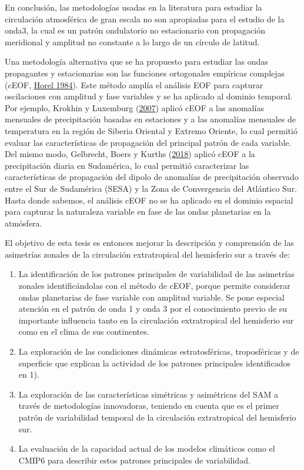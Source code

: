 \documentclass[12pt,oneside,a4paper]{reedthesis}
\begin{document}
En conclusión, las metodologías usadas en la literatura para estudiar la circulación atmosférica de gran escala no son apropiadas para el estudio de la onda3, la cual es un patrón ondulatorio no estacionario con propagación meridional y amplitud no constante a lo largo de un círculo de latitud.

Una metodología alternativa que se ha propuesto para estudiar las ondas propagantes y estacionarias son las funciones ortogonales empíricas complejas (cEOF, \protect\hyperlink{ref-horel1984}{Horel 1984}).
Este método amplía el análisis EOF para capturar oscilaciones con amplitud y fase variables y se ha aplicado al dominio temporal.
Por ejemplo, Krokhin y Luxemburg (\protect\hyperlink{ref-krokhin2007}{2007}) aplicó cEOF a las anomalías mensuales de precipitación basadas en estaciones y a las anomalías mensuales de temperatura en la región de Siberia Oriental y Extremo Oriente, lo cual permitió evaluar las características de propagación del principal patrón de cada variable.
Del mismo modo, Gelbrecht, Boers y Kurths (\protect\hyperlink{ref-gelbrecht2018}{2018}) aplicó cEOF a la precipitación diaria en Sudamérica, lo cual permitió caracterizar las características de propagación del dipolo de anomalías de precipitación observado entre el Sur de Sudamérica (SESA) y la Zona de Convergencia del Atlántico Sur.
Hasta donde sabemos, el análisis cEOF no se ha aplicado en el dominio espacial para capturar la naturaleza variable en fase de las ondas planetarias en la atmósfera.

El objetivo de esta tesis es entonces mejorar la descripción y comprensión de las asimetrías zonales de la circulación extratropical del hemisferio sur a través de:

\begin{enumerate}
\def\labelenumi{\arabic{enumi}.}
\item
  La identificación de los patrones principales de variabilidad de las asimetrías zonales identificándolas con el método de cEOF, porque permite considerar ondas planetarias de fase variable con amplitud variable.
  Se pone especial atención en el patrón de onda 1 y onda 3 por el conocimiento previo de su importante influencia tanto en la circulación extratropical del hemisferio sur como en el clima de sus continentes.
\item
  La exploración de las condiciones dinámicas estratosféricas, troposféricas y de superficie que explican la actividad de los patrones principales identificados en 1).
\item
  La exploración de las características simétricas y asimétricas del SAM a través de metodologías innovadoras, teniendo en cuenta que es el primer patrón de variabilidad temporal de la circulación extratropical del hemisferio sur.
\item
  La evaluación de la capacidad actual de los modelos climáticos como el CMIP6 para describir estos patrones principales de variabilidad.
\end{enumerate}
\end{document}
